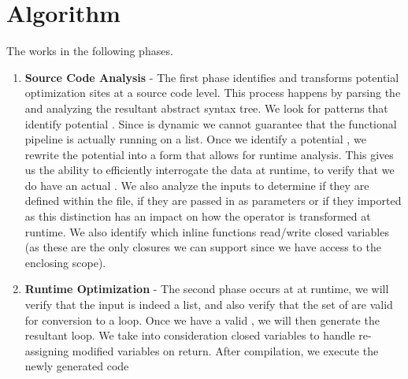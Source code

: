 \section{Algorithm}

The \javascript \algorithm works in the following phases.  
\begin{enumerate}
  \item \textbf{Source Code Analysis} - The first phase identifies and transforms potential optimization sites at a source code level. This process happens by parsing   the \javascript and analyzing the resultant abstract syntax tree.  We look for patterns that identify potential \pipelines.  Since \javascript is dynamic we cannot guarantee that the functional pipeline is actually running on a list.
  Once we identify a potential \pipeline, we rewrite the potential \pipeline into a form that allows for runtime analysis.  This gives us the ability to efficiently interrogate the data at runtime, to verify that we do have an actual \pipeline.  We also analyze the \pipelineoperator inputs to determine if they are defined within the file, if they are passed in as parameters or if they imported as this distinction has an impact on how the operator is transformed at runtime.  We also identify which inline functions read/write closed variables (as these are the only closures we can support since we have access to the enclosing scope).

  \item \textbf{Runtime Optimization} - The second phase occurs at at runtime, we will verify that the input is indeed a list, and also verify that the set of \pipelineoperators are valid for conversion to a  loop.  Once we have a valid \pipeline, we will then generate the resultant  loop.  We take into consideration closed variables to handle re-assigning modified variables on return. After compilation, we execute the newly generated code
\end{enumerate}